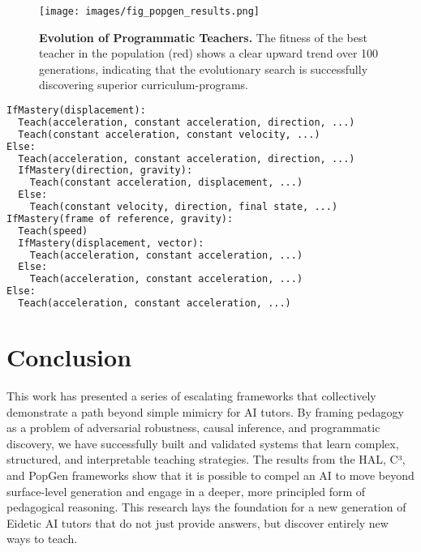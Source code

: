 \documentclass[11pt, letterpaper]{article}
\begin{document}
\begin{figure}[h!]
    \centering
    \texttt{[image: images/fig\_popgen\_results.png]}
    \caption{\textbf{Evolution of Programmatic Teachers.} The fitness of the best teacher in the population (red) shows a clear upward trend over 100 generations, indicating that the evolutionary search is successfully discovering superior curriculum-programs.}
    \label{fig:popgen_results}
\end{figure}

\begin{lstlisting}[language=Python, caption={Best Discovered Curriculum-Program}, label={lst:best_program}, basicstyle=\ttfamily\scriptsize]
IfMastery(displacement):
  Teach(acceleration, constant acceleration, direction, ...)
  Teach(constant acceleration, constant velocity, ...)
Else:
  Teach(acceleration, constant acceleration, direction, ...)
  IfMastery(direction, gravity):
    Teach(constant acceleration, displacement, ...)
  Else:
    Teach(constant velocity, direction, final state, ...)
IfMastery(frame of reference, gravity):
  Teach(speed)
  IfMastery(displacement, vector):
    Teach(acceleration, constant acceleration, ...)
  Else:
    Teach(acceleration, constant acceleration, ...)
Else:
  Teach(acceleration, constant acceleration, ...)
\end{lstlisting}

\section{Conclusion}
This work has presented a series of escalating frameworks that collectively demonstrate a path beyond simple mimicry for AI tutors. By framing pedagogy as a problem of adversarial robustness, causal inference, and programmatic discovery, we have successfully built and validated systems that learn complex, structured, and interpretable teaching strategies. The results from the HAL, C³, and PopGen frameworks show that it is possible to compel an AI to move beyond surface-level generation and engage in a deeper, more principled form of pedagogical reasoning. This research lays the foundation for a new generation of Eidetic AI tutors that do not just provide answers, but discover entirely new ways to teach.

\clearpage
\printbibliography
\end{document}

